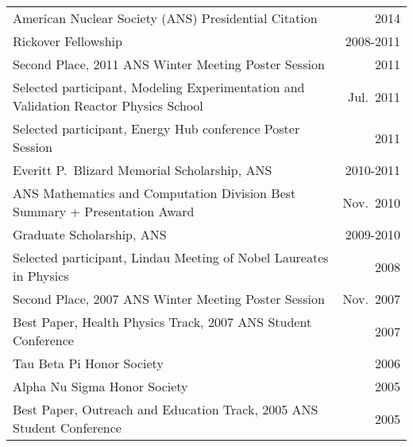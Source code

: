 \begin{tabular}{ @{} l @{\hspace{6ex}} r }
American Nuclear Society (ANS) Presidential Citation & 2014 \\
Rickover Fellowship 	& 2008-2011 \\
Second Place, 2011 ANS Winter Meeting Poster Session	&2011\\
Selected participant, Modeling Experimentation and Validation Reactor Physics School	& Jul.\ 2011\\
Selected participant, Energy Hub conference Poster Session	&2011\\
Everitt P.\ Blizard Memorial Scholarship, ANS	&2010-2011\\
ANS Mathematics and Computation Division Best Summary + Presentation Award  &Nov.\ 2010\\
Graduate Scholarship, ANS 	&2009-2010\\
Selected participant, Lindau Meeting of Nobel Laureates in Physics &	2008\\
Second Place, 2007 ANS Winter Meeting Poster Session	&Nov.\ 2007\\
Best Paper, Health Physics Track, 2007 ANS Student Conference 	&2007\\
Tau Beta Pi Honor Society	&2006\\
Alpha Nu Sigma Honor Society 	&2005 \\
Best Paper, Outreach and Education Track, 2005 ANS Student Conference	&2005
\end{tabular}

